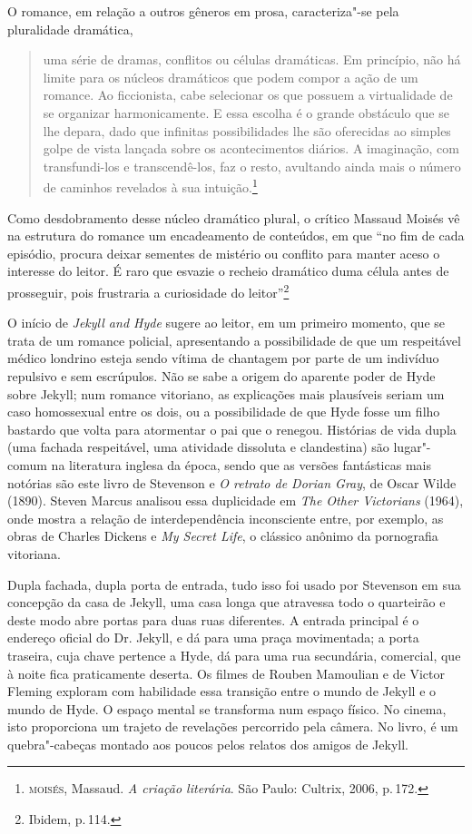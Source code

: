 O romance, em relação a outros gêneros em prosa, caracteriza"-se pela pluralidade dramática,

\begin{quote}
uma série de dramas, conflitos ou
células dramáticas. Em princípio, não há limite para os núcleos
dramáticos que podem compor a ação de um romance. Ao ficcionista,
cabe selecionar os que possuem a virtualidade de se organizar harmonicamente.
E essa escolha é o grande obstáculo que se lhe 
depara, dado que infinitas
possibilidades lhe são oferecidas ao
simples golpe de vista lançada sobre os acontecimentos diários.
A imaginação, com transfundi-los e transcendê-los, faz o resto,
avultando ainda mais o número de
caminhos revelados à sua intuição.\footnote{\textsc{moisés}, Massaud. \textit{A criação literária}. São Paulo: Cultrix, 2006, p.\,172.}
\end{quote}

Como desdobramento desse núcleo dramático plural, o crítico Massaud Moisés
vê na estrutura do romance um encadeamento de conteúdos, em que ``no fim de cada episódio, procura deixar sementes de mistério ou conflito para manter aceso o interesse do leitor. É raro que esvazie o recheio dramático duma célula antes de prosseguir, pois frustraria a curiosidade do leitor''\footnote{Ibidem, p.\,114.}

O início de \textit{Jekyll and Hyde} sugere ao leitor, em um primeiro momento,
que se trata de um romance policial,
apresentando a possibilidade de que um respeitável médico
londrino esteja sendo vítima de chantagem por parte de um indivíduo
repulsivo e sem escrúpulos.  Não se sabe a origem do aparente poder de
Hyde sobre Jekyll; num romance vitoriano, as explicações mais
plausíveis seriam um caso homossexual entre os dois, ou a possibilidade
de que Hyde fosse um filho bastardo que volta para atormentar o pai que
o renegou.  Histórias de vida dupla (uma fachada respeitável, uma
atividade dissoluta e clandestina) são lugar"-comum na literatura
inglesa da época, sendo que as versões fantásticas mais notórias são
este livro de Stevenson e \textit{O retrato de Dorian
Gray}, de Oscar Wilde (1890).  Steven Marcus analisou essa duplicidade
em \textit{The Other Victorians} (1964), onde mostra a relação de
interdependência inconsciente entre, por exemplo, as obras de Charles
Dickens e \textit{My Secret Life}, o clássico anônimo da pornografia
vitoriana. 

Dupla fachada, dupla porta de entrada, tudo isso foi usado por Stevenson
em sua concepção da casa de Jekyll, uma casa longa que atravessa todo o
quarteirão e deste modo abre portas para duas ruas diferentes.  A
entrada principal é o endereço oficial do Dr. Jekyll, e dá para uma
praça movimentada; a porta traseira, cuja chave pertence a Hyde, dá
para uma rua secundária, comercial, que à noite fica praticamente
deserta.  Os filmes de Rouben Mamoulian e de Victor Fleming exploram
com habilidade essa transição entre o mundo de Jekyll e o mundo de
Hyde.  O espaço mental se transforma num espaço físico. No cinema, isto
proporciona um trajeto de revelações percorrido pela câmera. No livro,
é um quebra"-cabeças montado aos poucos pelos relatos dos amigos de
Jekyll. 

